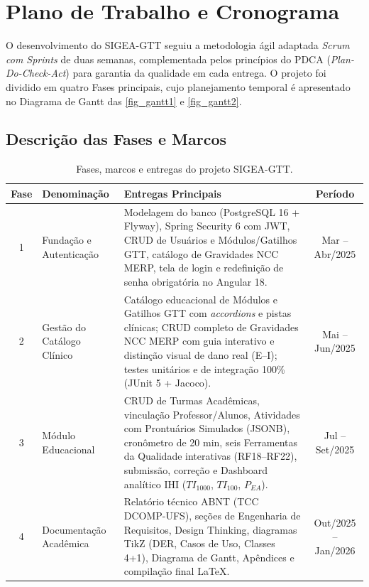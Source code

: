 \chapter{Plano de Trabalho e Cronograma}
\label{cap_plano_trabalho}

O desenvolvimento do SIGEA-GTT seguiu a metodologia ágil adaptada
\textit{Scrum com Sprints} de duas semanas, complementada pelos princípios
do PDCA (\textit{Plan-Do-Check-Act}) para garantia da qualidade em cada
entrega. O projeto foi dividido em quatro Fases principais, cujo
planejamento temporal é apresentado no Diagrama de Gantt das
\autoref{fig_gantt1} e \autoref{fig_gantt2}.

\section{Descrição das Fases e Marcos}
\label{sec_fases_marcos}

\begin{table}[htb]
\centering
\small
\caption{Fases, marcos e entregas do projeto SIGEA-GTT.}
\label{tab_fases}
\begin{tabularx}{\textwidth}{c l X c}
\toprule
\textbf{Fase} & \textbf{Denominação} & \textbf{Entregas Principais} & \textbf{Período} \\
\midrule
1 & Fundação e Autenticação &
    Modelagem do banco (PostgreSQL 16 + Flyway), Spring Security 6 com JWT,
    CRUD de Usuários e Módulos/Gatilhos GTT, catálogo de Gravidades NCC MERP,
    tela de login e redefinição de senha obrigatória no Angular 18.
    & Mar – Abr/2025 \\
\midrule
2 & Gestão do Catálogo Clínico &
    Catálogo educacional de Módulos e Gatilhos GTT com \textit{accordions}
    e pistas clínicas; CRUD completo de Gravidades NCC MERP com guia
    interativo e distinção visual de dano real (E–I);
    testes unitários e de integração 100\% (JUnit 5 + Jacoco).
    & Mai – Jun/2025 \\
\midrule
3 & Módulo Educacional &
    CRUD de Turmas Acadêmicas, vinculação Professor/Alunos, Atividades com
    Prontuários Simulados (JSONB), cronômetro de 20 min, seis Ferramentas da
    Qualidade interativas (RF18–RF22), submissão, correção e Dashboard analítico
    IHI ($TI_{1000}$, $TI_{100}$, $P_{EA}$).
    & Jul – Set/2025 \\
\midrule
4 & Documentação Acadêmica &
    Relatório técnico ABNT (TCC DCOMP-UFS), seções de Engenharia de Requisitos,
    Design Thinking, diagramas TikZ (DER, Casos de Uso, Classes 4+1),
    Diagrama de Gantt, Apêndices e compilação final LaTeX.
    & Out/2025 – Jan/2026 \\
\bottomrule
\end{tabularx}
\end{table}

